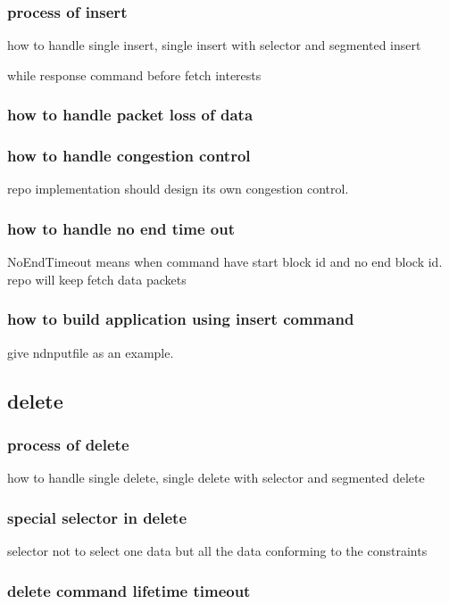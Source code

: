 \documentclass[conference]{IEEEtran}
\begin{document}
\subsubsection{process of insert}
how to handle single insert, single insert with selector and segmented insert

while response command before fetch interests

\subsubsection{how to handle packet loss of data}

\subsubsection{how to handle congestion control}
repo implementation should design its own congestion control.

\subsubsection{how to handle no end time out}
NoEndTimeout means when command have start block id and no end block id. repo will keep fetch data packets

\subsubsection{how to build application using insert command}
give ndnputfile as an example.

\subsection{delete}

\subsubsection{process of delete}
how to handle single delete, single delete with selector and segmented delete

\subsubsection{special selector in delete}
selector not to select one data but all the data conforming to the constraints

\subsubsection{delete command lifetime timeout}
\end{document}
